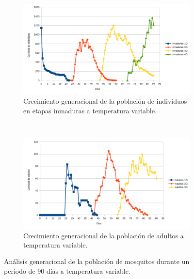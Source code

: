 \begin{figure}[!htbp]
    \centering
    \begin{subfigure}[b]{\textwidth}
        \includegraphics[width=\textwidth]{capitulo-6/graphics/temp-var-90-generacion-inmaduras.png}
        \caption{\label{fig:temp-var-inmaduras-generacion}Crecimiento generacional de la población de individuos en etapas inmaduras a temperatura variable.}
    \end{subfigure}
    ~~~~
    \begin{subfigure}[b]{\textwidth}
        \includegraphics[width=\textwidth]{capitulo-6/graphics/temp-var-90-generacion-adultos.png}
        \caption{\label{fig:temp-var-adultos-generacion}Crecimiento generacional de la población de adultos a temperatura variable.}
    \end{subfigure}

    \caption{\label{fig:temp-var-generacion} Análisis generacional de la población de mosquitos durante un periodo de 90 días a temperatura variable.}
\end{figure}
